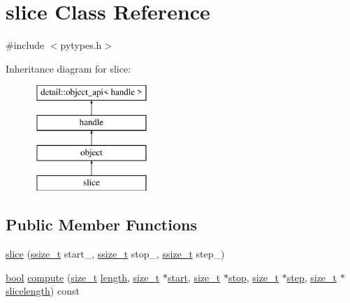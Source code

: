 \hypertarget{classslice}{}\section{slice Class Reference}
\label{classslice}


{\ttfamily \#include $<$pytypes.\+h$>$}

Inheritance diagram for slice\+:\begin{figure}[H]
\begin{center}
\leavevmode
\includegraphics[height=4.000000cm]{classslice}
\end{center}
\end{figure}
\subsection*{Public Member Functions}
\begin{DoxyCompactItemize}
\item 
\mbox{\hyperlink{classslice_a4caff82ebcad8f35458f8519aa0a9f77}{slice}} (\mbox{\hyperlink{detail_2common_8h_ac430d16fc097b3bf0a7469cfd09decda}{ssize\+\_\+t}} start\+\_\+, \mbox{\hyperlink{detail_2common_8h_ac430d16fc097b3bf0a7469cfd09decda}{ssize\+\_\+t}} stop\+\_\+, \mbox{\hyperlink{detail_2common_8h_ac430d16fc097b3bf0a7469cfd09decda}{ssize\+\_\+t}} step\+\_\+)
\item 
\mbox{\hyperlink{asdl_8h_af6a258d8f3ee5206d682d799316314b1}{bool}} \mbox{\hyperlink{classslice_ab45c9007278b27dcc5bacc3eb38be926}{compute}} (\mbox{\hyperlink{detail_2common_8h_a801d6a451a01953ef8cbae6feb6a3638}{size\+\_\+t}} \mbox{\hyperlink{_s_d_l__opengl__glext_8h_ab9c919755bde3b34349e23a32b4e0fa7}{length}}, \mbox{\hyperlink{detail_2common_8h_a801d6a451a01953ef8cbae6feb6a3638}{size\+\_\+t}} $\ast$\mbox{\hyperlink{_s_d_l__opengl_8h_ac55adc720a3098c1b454d2a4647f4361}{start}}, \mbox{\hyperlink{detail_2common_8h_a801d6a451a01953ef8cbae6feb6a3638}{size\+\_\+t}} $\ast$\mbox{\hyperlink{sliceobject_8h_a0719f2c2d2ec8c6ec37d64a00e59cf94}{stop}}, \mbox{\hyperlink{detail_2common_8h_a801d6a451a01953ef8cbae6feb6a3638}{size\+\_\+t}} $\ast$\mbox{\hyperlink{sliceobject_8h_ad30ad6864738676236ebf5de71ff05f5}{step}}, \mbox{\hyperlink{detail_2common_8h_a801d6a451a01953ef8cbae6feb6a3638}{size\+\_\+t}} $\ast$\mbox{\hyperlink{sliceobject_8h_a7ff52ed17e07dc84149981f59ae21d26}{slicelength}}) const
\end{DoxyCompactItemize}
